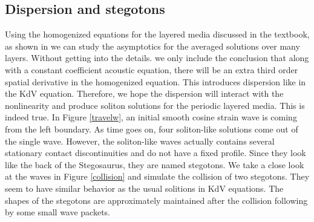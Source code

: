 \documentclass{article}
\begin{document}
\subsection{Dispersion and stegotons}
Using the homogenized equations for the layered media discussed in the textbook, as shown in \cite{leveque2003} we can study the asymptotics for the averaged solutions over many layers. Without getting into the details. we only include the conclusion that along with a constant coefficient acoustic equation, there will be an extra third order spatial derivative in the homogenized equation. This introduces dispersion like in the KdV equation. Therefore, we hope the dispersion will interact with the nonlinearity and produce soliton solutions for the periodic layered media. This is indeed true. In Figure \ref{travelw}, an initial smooth cosine strain wave is coming from the left boundary. As time goes on, four soliton-like solutions come out of the single wave. However, the soliton-like waves actually contains several stationary contact discontinuities and do not have a fixed profile. Since they look like the back of the Stegosaurus, they are named stegotons. We take a close look at the waves in Figure \ref{collision} and simulate the collision of two stegotons. They seem to have similar behavior as the usual solitions in KdV equations. The shapes of the stegotons are approximately maintained after the collision following by some small wave packets.
\end{document}
